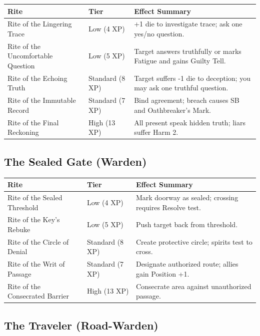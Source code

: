 \begin{longtable}{p{} p{} p{}}
\hline
\textbf{Rite} & \textbf{Tier} & \textbf{Effect Summary} \\
\hline
Rite of the Lingering Trace & Low (4 XP) & +1 die to investigate trace; ask one yes/no question. \\
Rite of the Uncomfortable Question & Low (5 XP) & Target answers truthfully or marks Fatigue and gains Guilty Tell. \\
Rite of the Echoing Truth & Standard (8 XP) & Target suffers -1 die to deception; you may ask one truthful question. \\
Rite of the Immutable Record & Standard (7 XP) & Bind agreement; breach causes SB and Oathbreaker's Mark. \\
Rite of the Final Reckoning & High (13 XP) & All present speak hidden truth; liars suffer Harm 2. \\
\hline
\end{longtable}

\subsection{The Sealed Gate (Warden)}

\begin{longtable}{p{} p{} p{}}
\hline
\textbf{Rite} & \textbf{Tier} & \textbf{Effect Summary} \\
\hline
Rite of the Sealed Threshold & Low (4 XP) & Mark doorway as sealed; crossing requires Resolve test. \\
Rite of the Key's Rebuke & Low (5 XP) & Push target back from threshold. \\
Rite of the Circle of Denial & Standard (8 XP) & Create protective circle; spirits test to cross. \\
Rite of the Writ of Passage & Standard (7 XP) & Designate authorized route; allies gain Position +1. \\
Rite of the Consecrated Barrier & High (13 XP) & Consecrate area against unauthorized passage. \\
\hline
\end{longtable}

\subsection{The Traveler (Road-Warden)}

